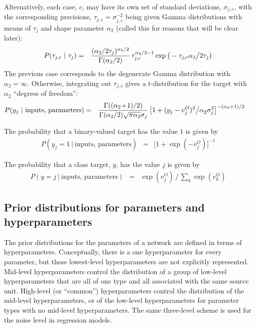 \documentclass{report}[11pt]
\def\beq{\begin{eqnarray}}
\def\eeq{\end{eqnarray}}
\def\eep{\end{eqnarray}}
\begin{document}
Alternatively, each case, $c$, may have its own set of standard
deviations, $\sigma_{j,c}$, with the corresponding precisions,
$\tau_{j,c} = \sigma_{j,c}^{-2}$ being given Gamma distributions with
means of $\tau_{j}$ and shape parameter $\alpha_2$ (called this for
reasons that will be clear later):\beq
  P(\tau_{j,c}\ |\ \tau_{j}) 
   & = & {(\alpha_2/2\tau_j)^{\alpha_2/2} \over \Gamma(\alpha_2/2)}\,
         \tau_{j,c}^{\alpha_2/2-1}
         \exp \big(-\tau_{j,c} \alpha_2 \big/ 2 \tau_{j} \big)
\eeq%
The previous case corresponds to the degenerate Gamma distribution
with $\alpha_2=\infty$.  Otherwise, integrating out $\tau_{j,c}$ gives a 
$t$-distribution for the target with $\alpha_2$ ``degrees of freedom'':\beq
  P(y_j\ |\ \mbox{inputs},\, \mbox{parameters}) & = &
    {\Gamma((\alpha_2\!+\!1)/2) \over \Gamma(\alpha_2/2) 
     \sqrt{\pi\alpha_2}\sigma_j}\,
     \big[ 1 + (y_j-v^O_j)^2\big/\alpha_2^{\ }\sigma_j^2 \big]^{-(\alpha_2+1)/2}
     \ \ \
\label{regt}\eep

The probability that a binary-valued target has the value $1$ is given by \beq
  P(y_j = 1\ |\ \mbox{inputs},\, \mbox{parameters}) & = & 
    \big[ 1 + \exp(-v^O_j) \big]^{-1}
\label{bin}\eep

The probability that a class target, $y$, has the value $j$ is given by\beq
  P(y = j\ |\ \mbox{inputs},\, \mbox{parameters}) & = & 
    \textstyle \exp(v^O_j) \,\big/\, \sum\limits_k \exp(v^O_k)
\label{softmax}\eep


\subsection*{Prior distributions for parameters and hyperparameters}

The prior distributions for the parameters of a network are defined in
terms of hyperparameters.  Conceptually, there is a one hyperparameter
for every parameter, but these lowest-level hyperparameters are not
explicitly represented.  Mid-level hyperparameters control the
distribution of a group of low-level hyperparameters that are all of
one type and all associated with the same source unit.  High-level (or
``common'') hyperparameters control the distribution of the mid-level
hyperparameters, or of the low-level hyperparameters for parameter
types with no mid-level hyperparameters.  The same three-level scheme
is used for the noise level in regression models.
\end{document}
